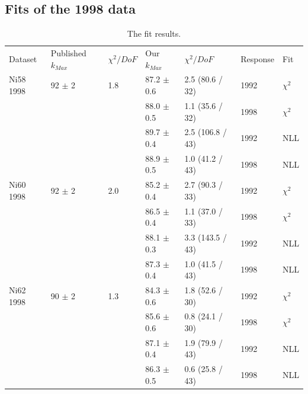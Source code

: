 \subsection { Fits of the 1998 data }
\begin{table}[H]
  \begin{center}
    \begin{tabular}{|l||l|l|l|l|l|l|}
      \hline
      Dataset & Published $k_{Max}$ & $\chi^2 / DoF$ & Our $k_{Max}$ & $\chi^2 / DoF$  & Response & Fit \\
      \hhline{|=||=|=|=|=|=|=|}
       Ni58 1998 & 92   $\pm$ 2   & 1.8 & 87.2 $\pm$ 0.6 & 2.5 (80.6 / 32) & 1992 & $\chi^2$ \\  
                 &                &     & 88.0 $\pm$ 0.5 & 1.1 (35.6 / 32) & 1998 & $\chi^2$ \\  
                                                                            
                &                 &     & 89.7 $\pm$ 0.4 & 2.5 (106.8 / 43) & 1992 & NLL \\
                &                 &     & 88.9 $\pm$ 0.5 & 1.0 (41.2 / 43) & 1998 & NLL \\
      \hline                                                                
       Ni60 1998 & 92   $\pm$ 2   & 2.0 & 85.2 $\pm$ 0.4 & 2.7 (90.3 / 33) & 1992 & $\chi^2$ \\  
                 &                &     & 86.5 $\pm$ 0.4 & 1.1 (37.0 / 33) & 1998 & $\chi^2$ \\  
                                                                            
                &                 &     & 88.1 $\pm$ 0.3 & 3.3 (143.5 / 43) & 1992 & NLL \\
                &                 &     & 87.3 $\pm$ 0.4 & 1.0 (41.5 / 43) & 1998 & NLL \\
      \hline                                                                
       Ni62 1998 & 90   $\pm$ 2   & 1.3 & 84.3 $\pm$ 0.6 & 1.8 (52.6 / 30) & 1992 & $\chi^2$ \\  
                 &                &     & 85.6 $\pm$ 0.6 & 0.8 (24.1 / 30) & 1998 & $\chi^2$ \\  
                                                                            
                &                 &     & 87.1 $\pm$ 0.4 & 1.9 (79.9 / 43) & 1992 & NLL \\
                &                 &     & 86.3 $\pm$ 0.5 & 0.6 (25.8 / 43) & 1998 & NLL \\
      \hline                           
    \end{tabular}
  \end{center}
  \caption{The fit results.}
  \label{table:fits1998}
\end{table}

